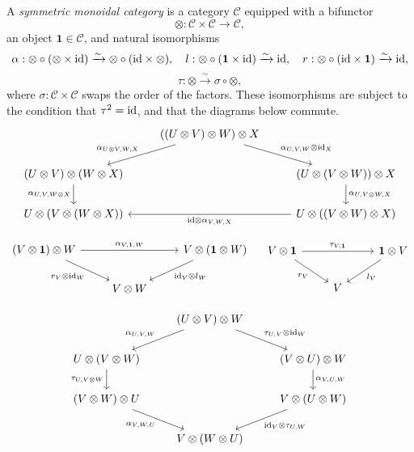 \documentclass{MetricNotes2023}
\def\id{\ensuremath\text{id}}
\begin{document}
\begin{definition}
A \textit{symmetric monoidal category} is a category \(\mathcal{C}\) equipped with a bifunctor 
\[\otimes : \mathcal{C} \times \mathcal{C}\to \mathcal{C},\]
an object \(\textbf{1}\in \mathcal{C}\), and natural isomorphisms
\[\alpha : \otimes \circ (\otimes \times \id) \xrightarrow{\sim}\otimes \circ (\id \times \otimes),\quad l : \otimes \circ (\textbf{1}\times \id)\xrightarrow\sim \id, \quad r : \otimes \circ (\id \times \textbf{1})\xrightarrow\sim \id,\]
\[\tau : \otimes \xrightarrow\sim \sigma \circ \otimes,\]
where \(\sigma : \mathcal{C} \times \mathcal{C}\) swaps the order of the factors. These isomorphisms are subject to the condition that \(\tau^2=\id\), and that the diagrams below commute.
\[\begin{tikzcd}
& ((U\otimes V)\otimes W)\otimes X \arrow[ld, swap, "\alpha_{U\otimes V, W, X}"] \arrow[rd, "\alpha_{U, V, W}\otimes \id_X"]  & \\
(U\otimes V)\otimes (W\otimes X) \arrow[d, swap, "\alpha_{U, V, W\otimes X}"]  & & (U\otimes(V\otimes W))\otimes X \arrow[d, "\alpha_{U, V\otimes W, X}"]\\
U\otimes(V\otimes(W\otimes X)) & & U\otimes((V\otimes W)\otimes X) \arrow[ll, "\id\otimes \alpha_{V, W,X}"]
\end{tikzcd}\]

\[\begin{tikzcd}
(V\otimes \textbf{1})\otimes W \arrow[rr, "\alpha_{V, \textbf{1}, W}"] \arrow[dr, swap, "r_V\otimes \id_W"]  & & V\otimes (\textbf{1}\otimes W) \arrow[dl, "\id_V\otimes l_W"]  \\
& V\otimes W & 
\end{tikzcd} \quad \begin{tikzcd}
V\otimes \textbf{1} \arrow[rr, "\tau_{V, \textbf{1}}"] \arrow[dr, swap, "r_V"]  & & \textbf{1}\otimes V \arrow[dl, "l_V"]  \\
& V & 
\end{tikzcd}\]

\[\begin{tikzcd}
& (U\otimes V)\otimes W \arrow[ld, swap, "\alpha_{U, V, W}"] \arrow[dr, "\tau_{U, V}\otimes\id_W"]  &  \\
U\otimes (V\otimes W) \arrow[d, swap, "\tau_{U, V\otimes W}"] & & (V\otimes U)\otimes W \arrow[d, "\alpha_{V, U, W}"]  \\
(V\otimes W)\otimes U \arrow[dr, swap, "\alpha_{V, W, U}"] & & V\otimes (U\otimes W) \arrow[dl, "\id_V \otimes \tau_{U, W}"]\\
& V\otimes (W\otimes U) &
\end{tikzcd}\]

\end{definition}
\end{document}

